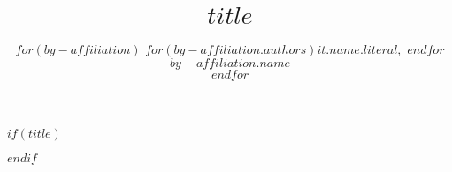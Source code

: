 $if(title)$
\title{$title$}
$endif$

\author{%
$for(by-affiliation)$
$for(by-affiliation.authors)$$it.name.literal$,\ $endfor$ \textit{$by-affiliation.name$}%
\vspace{1mm} \\%
$endfor$
}



